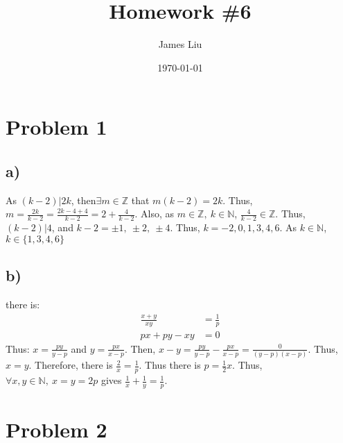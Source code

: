 \documentclass{article}
\title{\textbf{Homework \#6 }}
\author{James Liu}
\date{\today }
\begin{document}
\maketitle

\section*{Problem 1}
\subsection*{a)}
As \((k-2)|2k\), then\(\exists m\in \mathbb{Z}\) that \(m(k-2)=2k\).
Thus, \(m=\frac{2k}{k-2}=\frac{2k-4+4}{k-2}=2+\frac{4}{k-2}\). Also, 
as \(m\in \mathbb{Z},\ k\in \mathbb{N}\), \(\frac{4}{k-2}\in \mathbb{Z}\).
Thus, \((k-2)|4\), and \(k-2=\pm 1,\ \pm 2,\ \pm 4\). Thus, \(k=-2, 0 ,1, 3,4,6\).
As \(k\in \mathbb{N}\), \(k\in\{1,3,4,6\}\)




\subsection*{b)}
there is:
\begin{align*}
    \frac {x+y}{xy}&=\frac{1}{p}\\
    px+py-xy&=0
\end{align*}
Thus: \(\displaystyle{x=\frac{py}{y-p}}\) and \(\displaystyle{y=\frac{px}{x-p}}\).
Then, \(x-y=\displaystyle{\frac{py}{y-p}-\frac{px}{x-p}=\frac{0}{(y-p)(x-p)}}\).
Thus, \(x=y\). Therefore, there is \(\displaystyle{\frac{2}{x}=\frac{1}{p}}\).
Thus there is \(p=\frac{1}{2}x\). Thus, \(\forall x,y\in \mathbb{N},\ x=y=2p\) gives \(\frac{1}{x}+\frac{1}{y}=\frac{1}{p}\).

\section*{Problem 2}
\newpage
\end{document}
